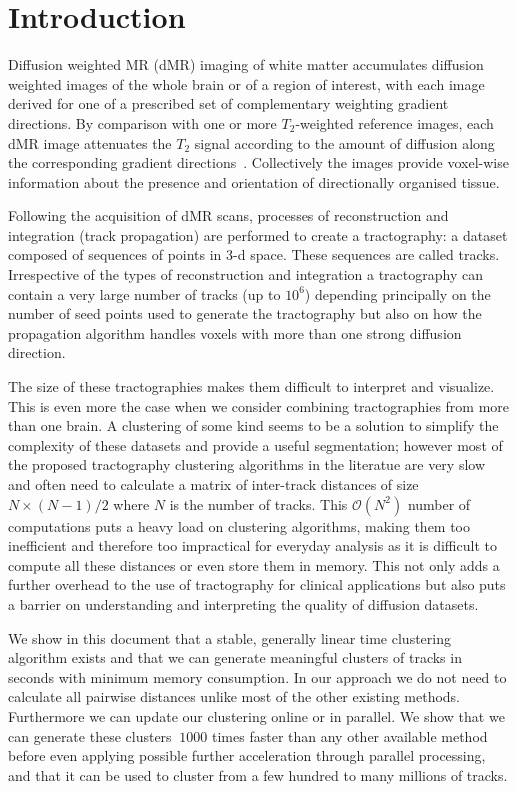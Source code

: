 \documentclass[preprint,authoryear,a4paper,10pt,onecolumn]{elsarticle}
\begin{document}
\section{Introduction}

Diffusion weighted MR (dMR) imaging of white matter accumulates diffusion
weighted images of the whole brain or of a region of interest, with each
image derived for one of a prescribed set of complementary weighting
gradient directions. By comparison with one or more $T_{2}$-weighted
reference images, each dMR image attenuates the $T_{2}$ signal according
to the amount of diffusion along the corresponding gradient directions~\citep{DiffMRIBook}. Collectively the images provide voxel-wise
information about the presence and orientation of directionally
organised tissue.

Following the acquisition of dMR scans, processes of reconstruction and
integration (track propagation) are performed to create a tractography:
a dataset composed of sequences of points in 3-d space. These sequences
are called tracks. Irrespective of the types of reconstruction and
integration a tractography can contain a very large number of tracks (up
to $10^6$) depending principally on the number of seed points used to
generate the tractography but also on how the propagation algorithm
handles voxels with more than one strong diffusion direction.

The size of these tractographies makes them difficult to interpret and
visualize. This is even more the case when we consider combining
tractographies from more than one brain. A clustering of some kind seems
to be a solution to simplify the complexity of these datasets and
provide a useful segmentation; however most of the proposed tractography
clustering algorithms in the literatue are very slow and often need to
calculate a matrix of inter-track distances of size $N\times (N-1)/2$
where $N$ is the number of tracks. This $\mathcal{O}(N^2)$ number of
computations puts a heavy load on clustering algorithms, making them too
inefficient and therefore too impractical for everyday analysis as it is
difficult to compute all these distances or even store them in
memory. This not only adds a further overhead to the use of tractography
for clinical applications but also puts a barrier on understanding and
interpreting the quality of diffusion datasets.

We show in this document that a stable, generally linear time clustering
algorithm exists and that we can generate meaningful clusters of tracks
in seconds with minimum memory consumption. In our approach we do not
need to calculate all pairwise distances unlike most of the other
existing methods. Furthermore we can update our clustering online or in
parallel. We show that we can generate these clusters $~1000$ times
faster than any other available method before even applying possible
further acceleration through parallel processing, and that it can be
used to cluster from a few hundred to many millions of tracks.
\end{document}
